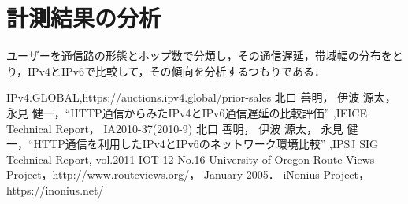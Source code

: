 \documentclass[rinkou,a4paper]{ieicej}
\begin{document}
\section{計測結果の分析}
ユーザーを通信路の形態とホップ数で分類し，その通信遅延，帯域幅の分布をとり，IPv4とIPv6で比較して，その傾向を分析するつもりである．

\begin{thebibliography}{9} %
IPv4.GLOBAL,https://auctions.ipv4.global/prior-sales
 北口 善明， 伊波 源太， 永見 健一，``HTTP通信からみたIPv4とIPv6通信遅延の比較評価'' ,IEICE Technical Report， IA2010-37(2010-9)
 北口 善明， 伊波 源太， 永見 健一，``HTTP通信を利用したIPv4とIPv6のネットワーク環境比較'' ,IPSJ SIG Technical Report, vol.2011-IOT-12 No.16
University of Oregon Route Views Project，http://www.routeviews.org/， January 2005．
iNonius Project，https://inonius.net/

\end{thebibliography}
\end{document}
